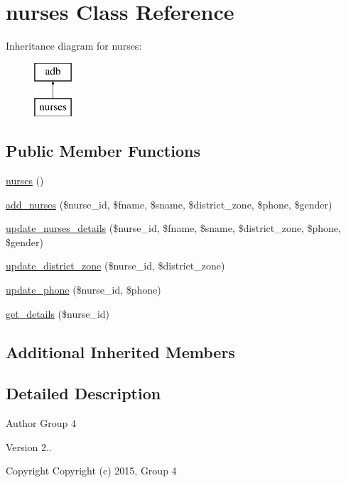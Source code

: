 \hypertarget{classnurses}{}\section{nurses Class Reference}
\label{classnurses}
Inheritance diagram for nurses\+:\begin{figure}[H]
\begin{center}
\leavevmode
\includegraphics[height=2.000000cm]{classnurses}
\end{center}
\end{figure}
\subsection*{Public Member Functions}
\begin{DoxyCompactItemize}
\item 
\hyperlink{classnurses_a205a7c77d5cabfd7e3aa00c584614c49}{nurses} ()
\item 
\hyperlink{classnurses_af48fb0637d02c2b5ce8dac5f3682d509}{add\+\_\+nurses} (\$nurse\+\_\+id, \$fname, \$sname, \$district\+\_\+zone, \$phone, \$gender)
\item 
\hyperlink{classnurses_afa6f9c095a07082895cc72dbad21284f}{update\+\_\+nurses\+\_\+details} (\$nurse\+\_\+id, \$fname, \$sname, \$district\+\_\+zone, \$phone, \$gender)
\item 
\hyperlink{classnurses_a7ea70a21e6caa98f84ee4d6c0e8099df}{update\+\_\+district\+\_\+zone} (\$nurse\+\_\+id, \$district\+\_\+zone)
\item 
\hyperlink{classnurses_ae0e679903683eb154f35878b3fa8aae3}{update\+\_\+phone} (\$nurse\+\_\+id, \$phone)
\item 
\hyperlink{classnurses_a48bc6073d4cb5b677ef3b0d018e2eebf}{get\+\_\+details} (\$nurse\+\_\+id)
\end{DoxyCompactItemize}
\subsection*{Additional Inherited Members}


\subsection{Detailed Description}
\begin{DoxyAuthor}{Author}
Group 4 
\end{DoxyAuthor}
\begin{DoxyVersion}{Version}
2.. 
\end{DoxyVersion}
\begin{DoxyCopyright}{Copyright}
Copyright (c) 2015, Group 4 
\end{DoxyCopyright}


